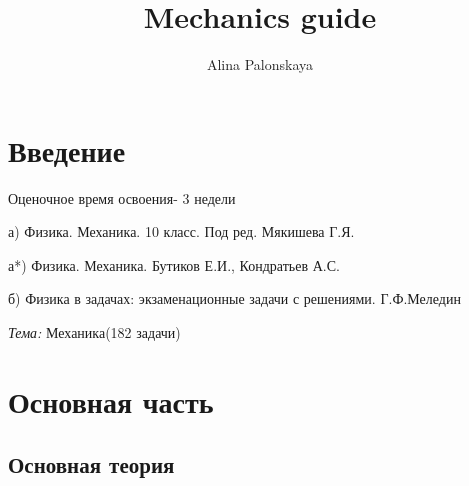 \documentclass{article}
\title{Mechanics guide}
\author{Alina Palonskaya}
\date{}
\begin{document}
\maketitle
\Large\section{Введение}

\large{Оценочное время освоения- 3 недели

а) Физика. Механика. 10 класс.  Под ред. Мякишева Г.Я.

а*) Физика. Механика. Бутиков Е.И., Кондратьев А.С.

б) Физика в задачах: экзаменационные задачи с решениями. Г.Ф.Меледин

\textit{Тема:} Механика(182 задачи) }

\Large\section{Основная часть}
\subsection{Основная теория}
\end{document}
